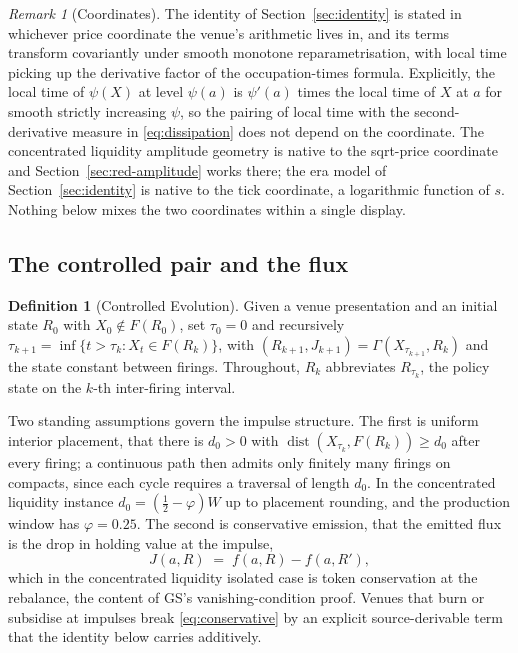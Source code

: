 \documentclass[11pt,a4paper]{article}
\theoremstyle{definition}
\newtheorem{definition}{Definition}
\theoremstyle{plain}
\theoremstyle{remark}
\newtheorem{remark}{Remark}
\begin{document}
\begin{remark}[Coordinates]\label{rem:coords}
The identity of Section~\ref{sec:identity} is stated in whichever price coordinate the venue's arithmetic lives in, and its terms transform covariantly under smooth monotone reparametrisation, with local
time picking up the derivative factor of the occupation-times formula. Explicitly, the local time of $\psi(X)$ at level $\psi(a)$ is $\psi'(a)$ times the local time of $X$ at $a$ for smooth strictly
increasing $\psi$, so the pairing of local time with the second-derivative measure in \eqref{eq:dissipation} does not depend on the coordinate.
The concentrated liquidity amplitude geometry is native to the sqrt-price coordinate and Section~\ref{sec:red-amplitude} works there; the era model of Section~\ref{sec:identity} is native to the tick
coordinate, a logarithmic function of $s$. Nothing below mixes the two coordinates within a single display.
\end{remark}

\subsection{The controlled pair and the flux}\label{sec:controlled}

\begin{definition}[Controlled Evolution]\label{def:controlled}
Given a venue presentation and an initial state $R_0$ with $X_0 \notin F(R_0)$, set $\tau_0 = 0$ and recursively $\tau_{k+1} = \inf\{t >\tau_k : X_t \in F(R_k)\}$, with $(R_{k+1}, J_{k+1}) =
\Gamma(X_{\tau_{k+1}}, R_k)$ and the state constant between firings. Throughout, $R_k$ abbreviates $R_{\tau_k}$, the policy state on the $k$-th inter-firing interval.
\end{definition}

Two standing assumptions govern the impulse structure. The first is uniform interior placement, that there is $d_0 > 0$ with $\operatorname{dist}(X_{\tau_k}, F(R_k)) \ge d_0$ after every
firing; a continuous path then admits only finitely many firings on compacts, since each cycle requires a traversal of length $d_0$. In the concentrated liquidity instance 
$d_0 = (\tfrac12 - \varphi) W$ up to placement rounding, and the production window has $\varphi = 0.25$. The second is conservative emission, that the emitted flux is the drop
in holding value at the impulse, 
\begin{equation}\label{eq:conservative}
J(a, R) \;=\; f(a, R) - f(a, R'),
\end{equation}
which in the concentrated liquidity isolated case is token conservation at the rebalance, the content of GS's vanishing-condition proof. Venues that burn or subsidise at impulses
break \eqref{eq:conservative} by an explicit source-derivable term that the identity below carries additively.
\end{document}

